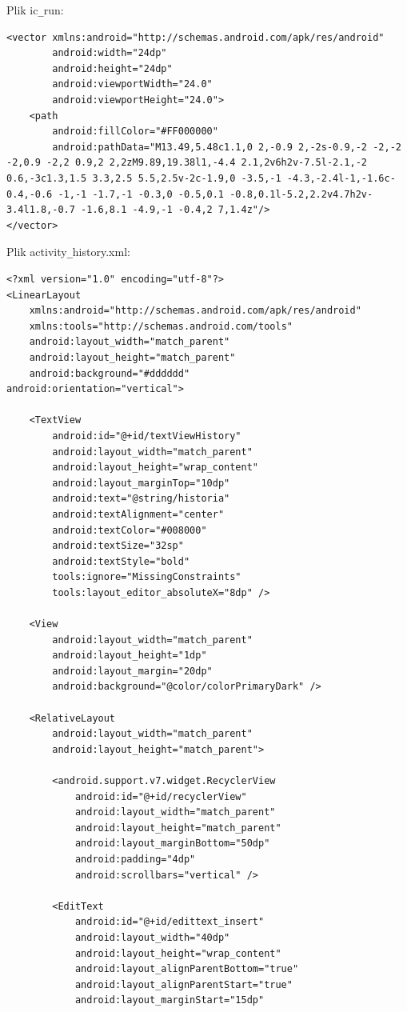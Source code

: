 \documentclass[a4paper]{article}
\begin{document}
Plik ic\verb|_|run:
\begin{lstlisting}[style=xml]
<vector xmlns:android="http://schemas.android.com/apk/res/android"
        android:width="24dp"
        android:height="24dp"
        android:viewportWidth="24.0"
        android:viewportHeight="24.0">
    <path
        android:fillColor="#FF000000"
        android:pathData="M13.49,5.48c1.1,0 2,-0.9 2,-2s-0.9,-2 -2,-2 -2,0.9 -2,2 0.9,2 2,2zM9.89,19.38l1,-4.4 2.1,2v6h2v-7.5l-2.1,-2 0.6,-3c1.3,1.5 3.3,2.5 5.5,2.5v-2c-1.9,0 -3.5,-1 -4.3,-2.4l-1,-1.6c-0.4,-0.6 -1,-1 -1.7,-1 -0.3,0 -0.5,0.1 -0.8,0.1l-5.2,2.2v4.7h2v-3.4l1.8,-0.7 -1.6,8.1 -4.9,-1 -0.4,2 7,1.4z"/>
</vector>
\end{lstlisting}

Plik activity\verb|_|history.xml:
\begin{lstlisting}[style=xml]
<?xml version="1.0" encoding="utf-8"?>
<LinearLayout
    xmlns:android="http://schemas.android.com/apk/res/android"
    xmlns:tools="http://schemas.android.com/tools"
    android:layout_width="match_parent"
    android:layout_height="match_parent"
    android:background="#dddddd"
android:orientation="vertical">

    <TextView
        android:id="@+id/textViewHistory"
        android:layout_width="match_parent"
        android:layout_height="wrap_content"
        android:layout_marginTop="10dp"
        android:text="@string/historia"
        android:textAlignment="center"
        android:textColor="#008000"
        android:textSize="32sp"
        android:textStyle="bold"
        tools:ignore="MissingConstraints"
        tools:layout_editor_absoluteX="8dp" />

    <View
        android:layout_width="match_parent"
        android:layout_height="1dp"
        android:layout_margin="20dp"
        android:background="@color/colorPrimaryDark" />

    <RelativeLayout
        android:layout_width="match_parent"
        android:layout_height="match_parent">

        <android.support.v7.widget.RecyclerView
            android:id="@+id/recyclerView"
            android:layout_width="match_parent"
            android:layout_height="match_parent"
            android:layout_marginBottom="50dp"
            android:padding="4dp"
            android:scrollbars="vertical" />

        <EditText
            android:id="@+id/edittext_insert"
            android:layout_width="40dp"
            android:layout_height="wrap_content"
            android:layout_alignParentBottom="true"
            android:layout_alignParentStart="true"
            android:layout_marginStart="15dp"


\end{lstlisting}
\end{document}
